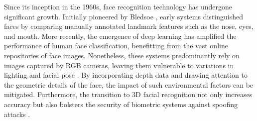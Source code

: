 \documentclass{mpaper}
\begin{document}
Since its inception in the 1960s, face recognition technology has undergone significant growth. Initially pioneered by Bledsoe \cite{bledsoe1966model}, early systems distinguished faces by comparing manually annotated landmark features such as the nose, eyes, and mouth. More recently, the emergence of deep learning has amplified the performance of human face classification, benefitting from the vast online repositories of face images. Nonetheless, these systems predominantly rely on images captured by RGB cameras, leaving them vulnerable to variations in lighting and facial pose \cite{xu2004depth}. By incorporating depth data and drawing attention to the geometric details of the face, the impact of such environmental factors can be mitigated. Furthermore, the transition to 3D facial recognition not only increases accuracy but also bolsters the security of biometric systems against spoofing attacks \cite{wen2015face}.
\end{document}

